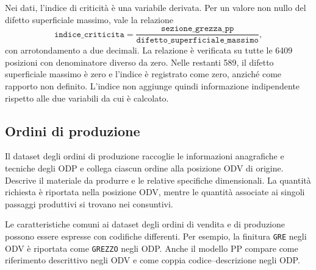 Nei dati, l'indice di criticità è una variabile derivata. Per un valore non nullo del difetto superficiale massimo, vale la relazione
\begin{equation}
\label{eq:criticality-index}
\texttt{indice\_criticita}
=\frac{\texttt{sezione\_grezza\_pp}}{\texttt{difetto\_superficiale\_massimo}},
\end{equation}
con arrotondamento a due decimali. La relazione è verificata su tutte le \num{6409} posizioni con denominatore diverso da zero. Nelle restanti \num{589}, il difetto superficiale massimo è zero e l'indice è registrato come zero, anziché come rapporto non definito. L'indice non aggiunge quindi informazione indipendente rispetto alle due variabili da cui è calcolato.

\subsection{Ordini di produzione}
\label{sec:production-order-data}

Il dataset degli ordini di produzione raccoglie le informazioni anagrafiche e tecniche degli ODP e collega ciascun ordine alla posizione ODV di origine. Descrive il materiale da produrre e le relative specifiche dimensionali. La quantità richiesta è riportata nella posizione ODV, mentre le quantità associate ai singoli passaggi produttivi si trovano nei consuntivi.

Le caratteristiche comuni ai dataset degli ordini di vendita e di produzione possono essere espresse con codifiche differenti. Per esempio, la finitura \texttt{GRE} negli ODV è riportata come \texttt{GREZZO} negli ODP. Anche il modello PP compare come riferimento descrittivo negli ODV e come coppia codice--descrizione negli ODP.

